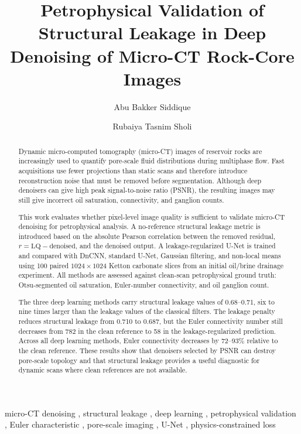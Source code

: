 \documentclass[review,12pt]{elsarticle}
\begin{document}
\begin{frontmatter}

\title{Petrophysical Validation of Structural Leakage in Deep
       Denoising of Micro-CT Rock-Core Images}

\author[1]{Abu Bakker Siddique}
\author[2]{Rubaiya Tasnim Sholi}


\address[1]{Department of Petroleum and Mining Engineering, Shahjalal
University of Science and Technology, Sylhet, Bangladesh}
\address[2]{Department of Computer Science and Engineering, Daffodil
International University, Dhaka, Bangladesh}

\begin{abstract}
Dynamic micro-computed tomography (micro-CT) images of reservoir rocks
are increasingly used to quantify pore-scale fluid distributions during
multiphase flow.  Fast acquisitions use fewer projections than static
scans and therefore introduce reconstruction noise that must be removed
before segmentation.  Although deep denoisers can give high peak
signal-to-noise ratio (PSNR), the resulting images may still give
incorrect oil saturation, connectivity, and ganglion counts.

This work evaluates whether pixel-level image quality is sufficient to
validate micro-CT denoising for petrophysical analysis.  A no-reference
structural leakage metric is introduced based on the absolute Pearson
correlation between the removed residual,
$r=\mathrm{LQ}-\mathrm{denoised}$, and the denoised output.  A
leakage-regularized U-Net is trained and compared with DnCNN, standard
U-Net, Gaussian filtering, and non-local means using 100 paired
$1024 \times 1024$ Ketton carbonate slices from an initial oil/brine
drainage experiment.  All methods are assessed against clean-scan
petrophysical ground truth: Otsu-segmented oil saturation, Euler-number
connectivity, and oil ganglion count.

The three deep learning methods carry structural leakage values of
0.68--0.71, six to nine times larger than the leakage values of the
classical filters.  The leakage penalty reduces structural leakage from
0.710 to 0.687, but the Euler connectivity number still decreases from
782 in the clean reference to 58 in the leakage-regularized prediction.
Across all deep learning methods, Euler connectivity decreases by
72--93\% relative to the clean reference.  These results show that
denoisers selected by PSNR can destroy pore-scale topology and that
structural leakage provides a useful diagnostic for dynamic scans where
clean references are not available.
\end{abstract}

\begin{keyword}
micro-CT denoising \sep
structural leakage \sep
deep learning \sep
petrophysical validation \sep
Euler characteristic \sep
pore-scale imaging \sep
U-Net \sep
physics-constrained loss
\end{keyword}

\end{frontmatter}
\end{document}
